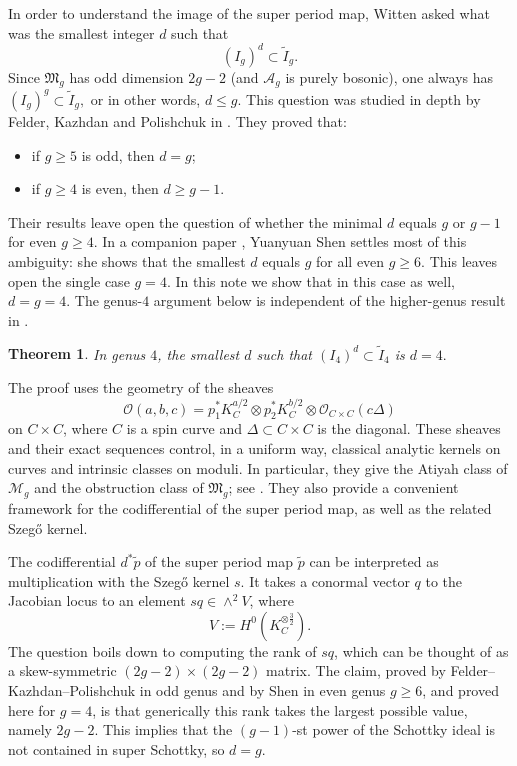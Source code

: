 \documentclass[10pt,a4paper]{amsart}
\newtheorem{theorem}{Theorem}[section]
\newcommand{\OO}{\mathcal O}
\newcommand{\MM}{\mathcal M}
\newcommand{\FM}{\mathfrak M}
\newcommand{\Aa}{\mathcal A}
\begin{document}
In order to understand the image of the super period map, Witten asked what was the smallest integer $d$ such that
\[
(I_g)^d\subset \widetilde I_g.
\]
Since $\FM_g$ has odd dimension $2g-2$ (and $\Aa_g$ is purely bosonic), one always has
$(I_g)^g\subset \widetilde I_g,$
or in other words, $d \leq g$.
This question was studied in depth by Felder, Kazhdan and Polishchuk in {\cite[Theorem~8.3]{FKP}}.
They proved that:
\begin{itemize}[leftmargin=2em]
\item if $g\geq5$ is odd, then $d=g$;
\item if $g\geq4$ is even, then $d\ge g-1$.
\end{itemize}
Their results leave open the question of whether the minimal $d$ equals $g$ or $g-1$ for even $g\ge 4$.
In a companion paper \cite{S}, Yuanyuan Shen settles most of this ambiguity:
she shows that the smallest $d$ equals $g$ for all even $g\ge 6$.
This leaves open the single case $g=4$. In this note we show that in this case as well, $d=g=4$.
{The genus-$4$ argument below is independent of the higher-genus result in \cite{S}.}



\begin{theorem}\label{thm:main}
In genus $4$, the smallest $d$ such that
$(I_4)^d\subset \widetilde I_4$
is $d=4.$
\end{theorem}



The proof uses the geometry of the sheaves
\[
\OO(a,b,c)=p_1^*K_C^{a/2}\otimes p_2^*K_C^{b/2}\otimes \OO_{C\times C}(c\Delta)
\]
on $C\times C$, where $C$ is a spin curve and $\Delta\subset C\times C$ is the diagonal.
These sheaves and their exact sequences control, in a uniform way,
classical analytic kernels on curves and intrinsic classes on moduli.
In particular, they give the Atiyah class of $\MM_g$ and the obstruction class of $\FM_g$;
see \cite{DW2}.
They also provide a convenient framework for the codifferential of the super period map,
as well as the related Szeg\H{o} kernel.

The codifferential ${d^*\widetilde{p}}$ of the super period map $\widetilde{p}$
can be interpreted as multiplication with the Szeg\H{o} kernel $s$.
It takes a conormal vector $q$ to the Jacobian locus
to an element $sq\in \wedge^2 V$, where
\[
V:=H^0(K_C^{\otimes \frac32}).
\]
The question boils down to computing the rank of $sq$,
which can be thought of as a skew-symmetric $(2g-2)\times (2g-2)$ matrix.
The claim, proved by Felder--Kazhdan--Polishchuk in odd genus and by Shen in even genus $g\ge 6$, and proved here for $g=4$,
is that generically this rank takes the largest possible value, namely $2g-2$.
This implies that the $(g-1)$-st power of the Schottky ideal is not contained in super Schottky,
so $d=g$.
\end{document}
